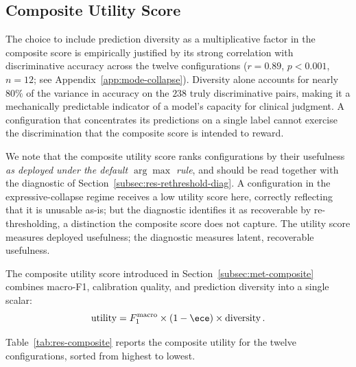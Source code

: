 \subsection{Composite Utility Score}
\label{subsec:res-composite}
The choice to include prediction diversity as a multiplicative factor 
in the composite score is empirically justified by its strong 
correlation with discriminative accuracy across the twelve 
configurations ($r = 0.89$, $p < 0.001$, $n = 12$; see 
Appendix~\ref{app:mode-collapse}). Diversity alone accounts for nearly 
$80\%$ of the variance in accuracy on the $238$ truly discriminative 
pairs, making it a mechanically predictable indicator of a model's 
capacity for clinical judgment. A configuration that concentrates its 
predictions on a single label cannot exercise the discrimination that 
the composite score is intended to reward.

We note that the composite utility score ranks configurations by their 
usefulness \emph{as deployed under the default $\arg\max$ rule}, and 
should be read together with the diagnostic of 
Section~\ref{subsec:res-rethreshold-diag}. A configuration in the 
expressive-collapse regime receives a low utility score here, correctly 
reflecting that it is unusable as-is; but the diagnostic identifies it as 
recoverable by re-thresholding, a distinction the composite score does 
not capture. The utility score measures deployed usefulness; the 
diagnostic measures latent, recoverable usefulness.

The composite utility score introduced in 
Section~\ref{subsec:met-composite} combines macro-F1, calibration 
quality, and prediction diversity into a single scalar:
\[
    \operatorname{utility} = F_1^{\text{macro}} \times (1 - \ece) \times 
    \operatorname{diversity}.
\]

Table~\ref{tab:res-composite} reports the composite utility for the 
twelve configurations, sorted from highest to lowest.

